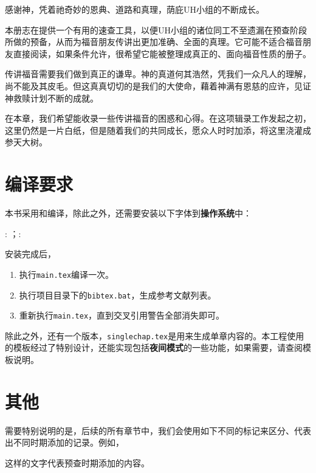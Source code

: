 \documentclass[Chinese,inNight]{CKBib}
\begin{document}

感谢神，凭着祂奇妙的恩典、道路和真理，荫庇UH小组的不断成长。

本册志在提供一个有用的速查工具，以便UH小组的诸位同工不至遗漏在预查阶段所做的预备，从而为福音朋友传讲出更加准确、全面的真理。它可能不适合福音朋友直接阅读，如果条件允许，很希望它能被整理成真正的、面向福音性质的册子。

传讲福音需要我们做到真正的谦卑。神的真道何其浩然，凭我们一众凡人的理解，尚不能及其皮毛。但这真真切切的是我们的大使命，藉着神满有恩慈的应许，见证神救赎计划不断的成就。

在本章，我们希望能收录一些传讲福音的困惑和心得。在这项辑录工作发起之初，这里仍然是一片白纸，但是随着我们的共同成长，愿众人时时加添，将这里浇灌成参天大树。

\section*{编译要求}

本书采用{\LaTeXe}和{\XeTeX}编译，除此之外，还需要安装以下字体到\textbf{操作系统}中：

\normalfont\selectfont: \href{https://blog.typekit.com/alternate/source-han-sans-chs/}{\Mundus}；\normalfont\selectfont: \href{https://source.typekit.com/source-han-serif/cn/}{\Mundus}

安装完成后，

\begin{enumerate}
  \item 执行\texttt{main.tex}编译一次。
  \item 执行项目目录下的\texttt{bibtex.bat}，生成参考文献列表。
  \item 重新执行\texttt{main.tex}，直到交叉引用警告全部消失即可。
\end{enumerate}

除此之外，还有一个版本，\texttt{singlechap.tex}是用来生成单章内容的。本工程使用的模板经过了特别设计，还能实现包括\textbf{夜间模式}的一些功能，如果需要，请查阅模板说明。

\section*{其他}

需要特别说明的是，后续的所有章节中，我们会使用如下不同的标记来区分、代表出不同时期添加的记录。例如，


这样的文字代表预查时期添加的内容。



\cleardoublepage

\end{document}
